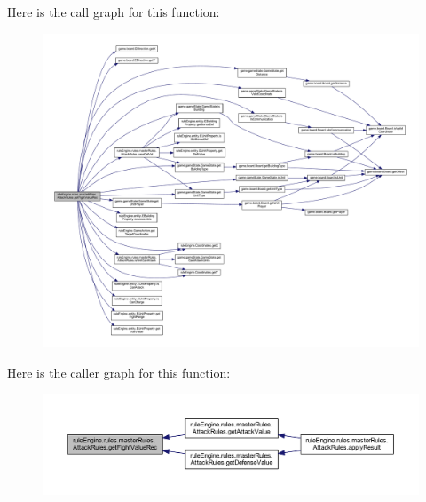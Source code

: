 Here is the call graph for this function\+:
\nopagebreak
\begin{figure}[H]
\begin{center}
\leavevmode
\includegraphics[width=350pt]{classrule_engine_1_1rules_1_1master_rules_1_1_attack_rules_ab245cc7a1359f4049b2434184bc44076_cgraph}
\end{center}
\end{figure}
Here is the caller graph for this function\+:
\nopagebreak
\begin{figure}[H]
\begin{center}
\leavevmode
\includegraphics[width=350pt]{classrule_engine_1_1rules_1_1master_rules_1_1_attack_rules_ab245cc7a1359f4049b2434184bc44076_icgraph}
\end{center}
\end{figure}
\mbox{\label{classrule_engine_1_1rules_1_1master_rules_1_1_attack_rules_a77e9058ba68078255c1b8080169ea651}} 
